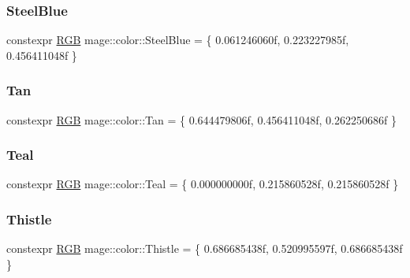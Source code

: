 \mbox{\label{namespacemage_1_1color_a2a4b03e450e79d03ce4e6061d54ad671}} 
\subsubsection{\texorpdfstring{Steel\+Blue}{SteelBlue}}
{\footnotesize\ttfamily constexpr \mbox{\hyperlink{structmage_1_1_r_g_b}{R\+GB}} mage\+::color\+::\+Steel\+Blue = \{ 0.\+061246060f, 0.\+223227985f, 0.\+456411048f \}}

\mbox{\label{namespacemage_1_1color_a1a70b829eefc1b4686d328747e4c712d}} 
\subsubsection{\texorpdfstring{Tan}{Tan}}
{\footnotesize\ttfamily constexpr \mbox{\hyperlink{structmage_1_1_r_g_b}{R\+GB}} mage\+::color\+::\+Tan = \{ 0.\+644479806f, 0.\+456411048f, 0.\+262250686f \}}

\mbox{\label{namespacemage_1_1color_a80f897dd60d4faed02aeb55da726e013}} 
\subsubsection{\texorpdfstring{Teal}{Teal}}
{\footnotesize\ttfamily constexpr \mbox{\hyperlink{structmage_1_1_r_g_b}{R\+GB}} mage\+::color\+::\+Teal = \{ 0.\+000000000f, 0.\+215860528f, 0.\+215860528f \}}

\mbox{\label{namespacemage_1_1color_a83d1f3bdc2f2cd9008bd7b3595a7ebe2}} 
\subsubsection{\texorpdfstring{Thistle}{Thistle}}
{\footnotesize\ttfamily constexpr \mbox{\hyperlink{structmage_1_1_r_g_b}{R\+GB}} mage\+::color\+::\+Thistle = \{ 0.\+686685438f, 0.\+520995597f, 0.\+686685438f \}}

